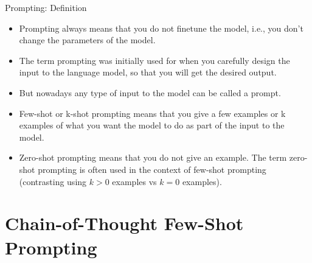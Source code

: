 \def\myblue#1{\textcolor{texblue}{#1}}

\begin{frame}{Prompting: Definition}

\vfill

\begin{itemize}

\item Prompting always means that you \myblue{do not finetune the model},
i.e., you don't change the parameters of the model.

\item The term prompting was initially used for when you \myblue{carefully design the
input to the language model}, so that you will get the
desired output.

\item \myblue{But nowadays any type of input to the model can be called
a prompt.}

\item \myblue{Few-shot or k-shot prompting} means that you give a few
examples or k examples of what you want the model to do
as part of the input to the model.

\item \myblue{Zero-shot prompting} means that you do not give an example.
The term zero-shot prompting is often used in the context of
few-shot prompting (contrasting using $k>0$ examples vs $k=0$
examples).

\end{itemize}

\vfill

\end{frame}


\section{Chain-of-Thought Few-Shot Prompting}




